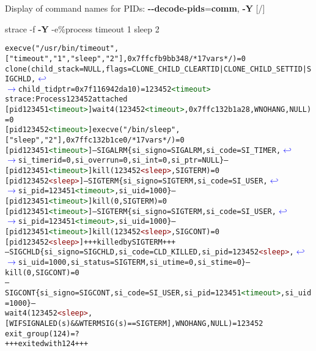 \documentclass[unicode,aspectratio=169,xcolor={table,dvipsnames,usernames}]{beamer}
\newcommand{\symlinebreak}{\textcolor{blue}{\(\hookleftarrow\)}}
\newcommand{\symlinecont}{\textcolor{blue}{\(\longrightarrow\)}}
\begin{document}
\begin{frame}[fragile]{Display of command names for PIDs: \textbf{-{}-decode-pids}=\textbf{comm}, \textbf{-Y} \hfill [\insertframenumber/\inserttotalframenumber]}
\small
\begin{block}{strace -f \textbf{-Y} -e\%process timeout 1 sleep 2}
\scriptsize
\begin{alltt}
execve("/usr/bin/timeout", ["timeout", "1", "sleep", "2"], 0x7ffcfb9bb348 /* 17 vars */) = 0
clone(child_stack=NULL, flags=CLONE_CHILD_CLEARTID|CLONE_CHILD_SETTID|SIGCHLD, \symlinebreak
\symlinecont child_tidptr=0x7f116942da10) = 123452\textcolor{darkgreen}{<timeout>}
strace: Process 123452 attached
[pid 123451\textcolor{darkgreen}{<timeout>}] wait4(123452\textcolor{darkgreen}{<timeout>}, 0x7ffc132b1a28, WNOHANG, NULL) = 0
[pid 123452\textcolor{darkgreen}{<timeout>}] execve("/bin/sleep", ["sleep", "2"], 0x7ffc132b1ce0 /* 17 vars */) = 0
[pid 123451\textcolor{darkgreen}{<timeout>}] --- SIGALRM \{si_signo=SIGALRM, si_code=SI_TIMER, \symlinebreak
\symlinecont si_timerid=0, si_overrun=0, si_int=0, si_ptr=NULL\} ---
[pid 123451\textcolor{darkgreen}{<timeout>}] kill(123452\textcolor{darkred}{<sleep>}, SIGTERM) = 0
[pid 123452\textcolor{darkred}{<sleep>}] --- SIGTERM \{si_signo=SIGTERM, si_code=SI_USER, \symlinebreak
\symlinecont si_pid=123451\textcolor{darkgreen}{<timeout>}, si_uid=1000\} ---
[pid 123451\textcolor{darkgreen}{<timeout>}] kill(0, SIGTERM) = 0
[pid 123451\textcolor{darkgreen}{<timeout>}] --- SIGTERM \{si_signo=SIGTERM, si_code=SI_USER, \symlinebreak
\symlinecont si_pid=123451\textcolor{darkgreen}{<timeout>}, si_uid=1000\} ---
[pid 123451\textcolor{darkgreen}{<timeout>}] kill(123452\textcolor{darkred}{<sleep>}, SIGCONT) = 0
[pid 123452\textcolor{darkred}{<sleep>}] +++ killed by SIGTERM +++
--- SIGCHLD \{si_signo=SIGCHLD, si_code=CLD_KILLED, si_pid=123452\textcolor{darkred}{<sleep>}, \symlinebreak
\symlinecont si_uid=1000, si_status=SIGTERM, si_utime=0, si_stime=0\} ---
kill(0, SIGCONT)                        = 0
--- SIGCONT \{si_signo=SIGCONT, si_code=SI_USER, si_pid=123451\textcolor{darkgreen}{<timeout>}, si_uid=1000\} ---
wait4(123452\textcolor{darkred}{<sleep>}, [{WIFSIGNALED(s) && WTERMSIG(s) == SIGTERM}], WNOHANG, NULL) = 123452
exit_group(124)                         = ?
+++ exited with 124 +++
\end{alltt}
\end{block}
\end{frame}
\end{document}
